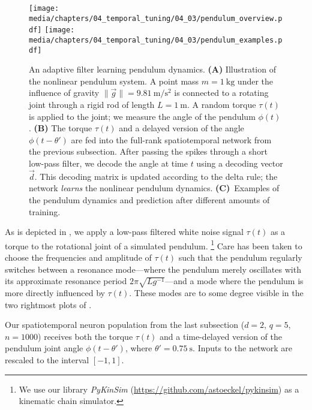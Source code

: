 \begin{figure}
	\centering
	\texttt{[image: media/chapters/04\_temporal\_tuning/04\_03/pendulum\_overview.pdf]}
	\texttt{[image: media/chapters/04\_temporal\_tuning/04\_03/pendulum\_examples.pdf]}%
	{\label{fig:pendulum_overview_a}}%
	{\label{fig:pendulum_overview_b}}%
	{\label{fig:pendulum_overview_c}}%
	\caption[An adaptive filter learning pendulum dynamics]{
		An adaptive filter learning pendulum dynamics.
		\textbf{(A)} Illustration of the nonlinear pendulum system.
		A point mass $m = \SI{1}{\kilogram}$ under the influence of gravity $\| \vec g \| = \SI{9.81}{\metre\per\square\second}$ is connected to a rotating joint through a rigid rod of length $L = \SI{1}{\metre}$.
		A random torque $\tau(t)$ is applied to the joint; we measure the angle of the pendulum $\phi(t)$.
		\textbf{(B)} The torque $\tau(t)$ and a delayed version of the angle $\phi(t - \theta')$ are fed into the full-rank spatiotemporal \NEF network from the previous subsection.
		After passing the spikes through a short low-pass filter, we decode the angle at time $t$ using a decoding vector $\vec d$.
		This decoding matrix is updated according to the delta rule; the network \emph{learns} the nonlinear pendulum dynamics.
		\textbf{(C)}~Examples of the pendulum dynamics and prediction after different amounts of training.
	}
	\label{fig:pendulum_overview}
\end{figure}
As is depicted in , we apply a low-pass filtered white noise signal $\tau(t)$ as a torque to the rotational joint of a simulated pendulum.%
\footnote{We use our library \emph{PyKinSim} (\url{https://github.com/astoeckel/pykinsim}) as a kinematic chain simulator.}
Care has been taken to choose the frequencies and amplitude of $\tau(t)$ such that the pendulum regularly switches between a resonance mode---where the pendulum merely oscillates with its approximate resonance period $2 \pi \sqrt{L g^{-1}}$---and a mode where the pendulum is more directly influenced by $\tau(t)$.
These modes are to some degree visible in the two rightmost plots of .

Our spatiotemporal neuron population from the last subsection ($d = 2$, $q = 5$, $n = 1000$) receives both the torque $\tau(t)$ and a time-delayed version of the pendulum joint angle $\phi(t - \theta')$, where $\theta' = \SI{0.75}{\second}$.
Inputs to the network are rescaled to the interval $[-1, 1]$.

\pagebreak


